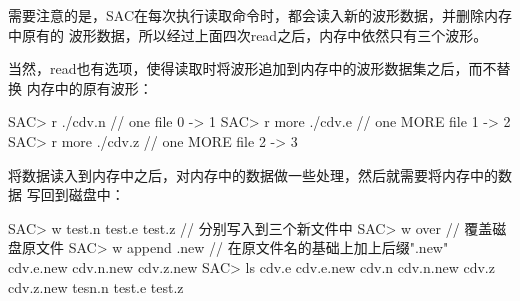 需要注意的是，SAC在每次执行读取命令时，都会读入新的波形数据，并删除内存中原有的
波形数据，所以经过上面四次read之后，内存中依然只有三个波形。

当然，read也有选项，使得读取时将波形追加到内存中的波形数据集之后，而不替换
内存中的原有波形：
\begin{SACCode}
SAC> r ./cdv.n              // one file       0 -> 1
SAC> r more ./cdv.e         // one MORE file  1 -> 2
SAC> r more ./cdv.z         // one MORE file  2 -> 3
\end{SACCode}

将数据读入到内存中之后，对内存中的数据做一些处理，然后就需要将内存中的数据
写回到磁盘中：
\begin{SACCode}
SAC> w test.n test.e test.z         // 分别写入到三个新文件中
SAC> w over                         // 覆盖磁盘原文件
SAC> w append .new                  // 在原文件名的基础上加上后缀".new"
cdv.e.new cdv.n.new cdv.z.new
SAC> ls
cdv.e  cdv.e.new  cdv.n  cdv.n.new  cdv.z  cdv.z.new  tesn.n  test.e  test.z
\end{SACCode}

